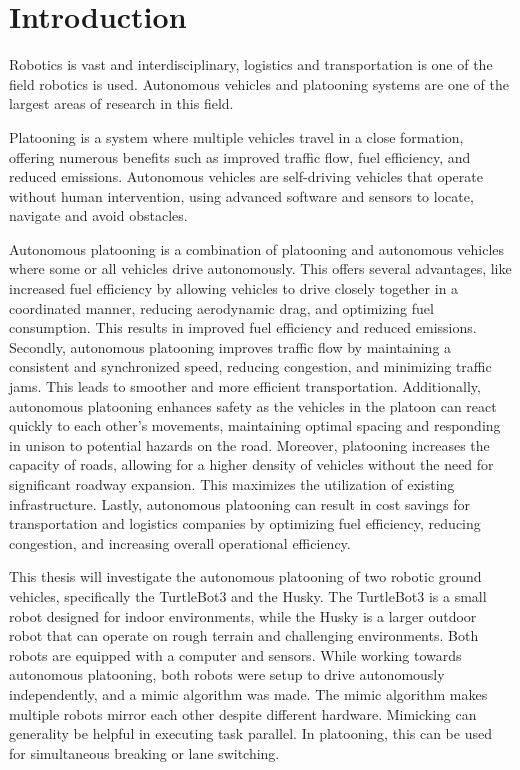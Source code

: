 \chapter{Introduction}

Robotics is vast and interdisciplinary, logistics and transportation is one of the field robotics is used. Autonomous vehicles and platooning systems are one of the largest areas of research in this field. 

Platooning is a system where multiple vehicles travel in a close formation, offering numerous benefits such as improved traffic flow, fuel efficiency, and reduced emissions. Autonomous vehicles are self-driving vehicles that operate without human intervention, using advanced software and sensors to locate, navigate and avoid obstacles. 


Autonomous platooning is a combination of platooning and autonomous vehicles where some or all vehicles drive autonomously. This offers several advantages, like increased fuel efficiency by allowing vehicles to drive closely together in a coordinated manner, reducing aerodynamic drag, and optimizing fuel consumption. This results in improved fuel efficiency and reduced emissions. Secondly, autonomous platooning improves traffic flow by maintaining a consistent and synchronized speed, reducing congestion, and minimizing traffic jams. This leads to smoother and more efficient transportation. Additionally, autonomous platooning enhances safety as the vehicles in the platoon can react quickly to each other's movements, maintaining optimal spacing and responding in unison to potential hazards on the road. Moreover, platooning increases the capacity of roads, allowing for a higher density of vehicles without the need for significant roadway expansion. This maximizes the utilization of existing infrastructure. Lastly, autonomous platooning can result in cost savings for transportation and logistics companies by optimizing fuel efficiency, reducing congestion, and increasing overall operational efficiency. 


This thesis will investigate the autonomous platooning of two robotic ground vehicles, specifically the TurtleBot3 and the Husky. The TurtleBot3 is a small robot designed for indoor environments, while the Husky is a larger outdoor robot that can operate on rough terrain and challenging environments. Both robots are equipped with a computer and sensors. While working towards autonomous platooning, both robots were setup to drive autonomously independently, and a mimic algorithm was made. The mimic algorithm makes multiple robots mirror each other despite different hardware. Mimicking can generality be helpful in executing task parallel. In platooning, this can be used for simultaneous breaking or lane switching.   



